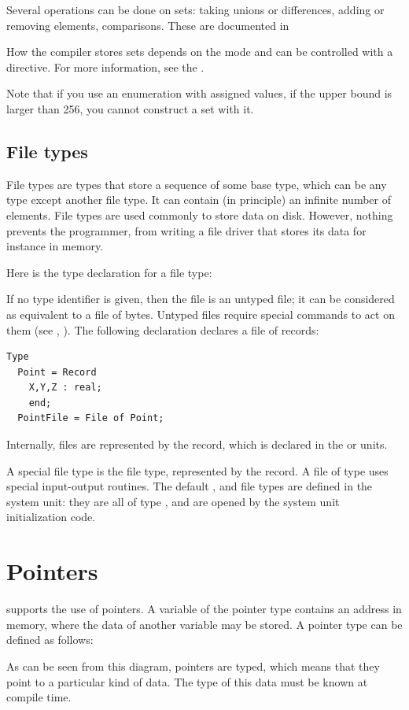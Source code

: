 Several operations can be done on sets: taking unions or differences, adding
or removing elements, comparisons. These are documented in

How the compiler stores sets depends on the mode and can be controlled with
a directive. For more information, see the \progref.

Note that if you use an enumeration with assigned values, if the upper bound
is larger than 256, you cannot construct a set with it.


%
%
\subsection{File types}
File types are types that store a sequence of some base type, which can be
any type except another file type. It can contain (in principle) an infinite
number of elements.
File types are used commonly to store data on disk. However, nothing prevents the programmer,
from writing a file driver that stores its data for instance in memory.

Here is the type declaration for a file type:

If no type identifier is given, then the file is an untyped file; it can be
considered as equivalent to a file of bytes. Untyped files require special
commands to act on them (see , ).
The following declaration declares a file of records:
\begin{verbatim}
Type
  Point = Record
    X,Y,Z : real;
    end;
  PointFile = File of Point;
\end{verbatim}
Internally, files are represented by the  record, which is
declared in the  or  units.

A special file type is the  file type, represented by the
 record. A file of type  uses special input-output
routines. The default ,  and  file
types are defined in the system unit: they are all of type , and
are opened by the system unit initialization code.

\section{Pointers}
\fpc supports the use of pointers. A variable of the pointer type
contains an address in memory, where the data of another variable may be
stored. A pointer type can be defined as follows:

As can be seen from this diagram, pointers are typed, which means that
they point to a particular kind of data. The type of this data must be
known at compile time.

